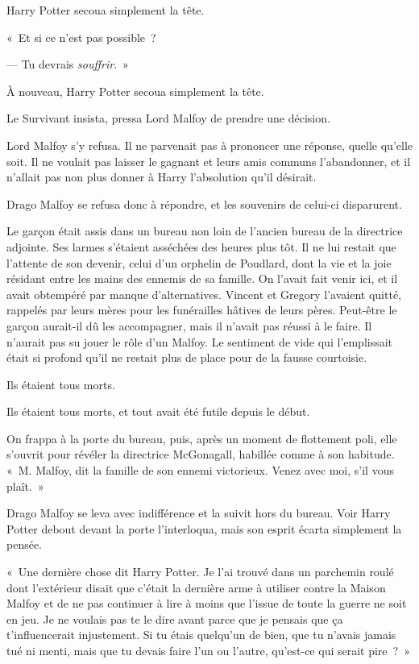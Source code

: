 Harry Potter secoua simplement la tête.

«~Et si ce n'est pas possible~?

--- Tu devrais \emph{souffrir}.~»

À nouveau, Harry Potter secoua simplement la tête.

Le Survivant insista, pressa Lord Malfoy de prendre une décision.

Lord Malfoy s'y refusa.
Il ne parvenait pas à prononcer une réponse, quelle qu'elle soit.
Il ne voulait pas laisser le gagnant et leurs amis communs l'abandonner, et il n'allait pas non plus donner à Harry l'absolution qu'il désirait.

Drago Malfoy se refusa donc à répondre, et les souvenirs de celui-ci disparurent.

\later

Le garçon était assis dans un bureau non loin de l'ancien bureau de la directrice adjointe.
Ses larmes s'étaient asséchées des heures plus tôt.
Il ne lui restait que l'attente de son devenir, celui d'un orphelin de Poudlard, dont la vie et la joie résidant entre les mains des ennemis de sa famille.
On l'avait fait venir ici, et il avait obtempéré par manque d'alternatives.
Vincent et Gregory l'avaient quitté, rappelés par leurs mères pour les funérailles hâtives de leurs pères.
Peut-être le garçon aurait-il dû les accompagner, mais il n'avait pas réussi à le faire.
Il n'aurait pas su jouer le rôle d'un Malfoy.
Le sentiment de vide qui l'emplissait était si profond qu'il ne restait plus de place pour de la fausse courtoisie.

Ils étaient tous morts.

Ils étaient tous morts, et tout avait été futile depuis le début.

On frappa à la porte du bureau, puis, après un moment de flottement poli, elle s'ouvrit pour révéler la directrice McGonagall, habillée comme à son habitude.
«~M. Malfoy, dit la famille de son ennemi victorieux.
Venez avec moi, s'il vous plaît.~»

Drago Malfoy se leva avec indifférence et la suivit hors du bureau.
Voir Harry Potter debout devant la porte l'interloqua, mais son esprit écarta simplement la pensée.

«~Une dernière chose dit Harry Potter.
Je l'ai trouvé dans un parchemin roulé dont l'extérieur disait que c'était la dernière arme à utiliser contre la Maison Malfoy et de ne pas continuer à lire à moins que l'issue de toute la guerre ne soit en jeu.
Je ne voulais pas te le dire avant parce que je pensais que ça t'influencerait injustement.
Si tu étais quelqu'un de bien, que tu n'avais jamais tué ni menti, mais que tu devais faire l'un ou l'autre, qu'est-ce qui serait pire~?~»

